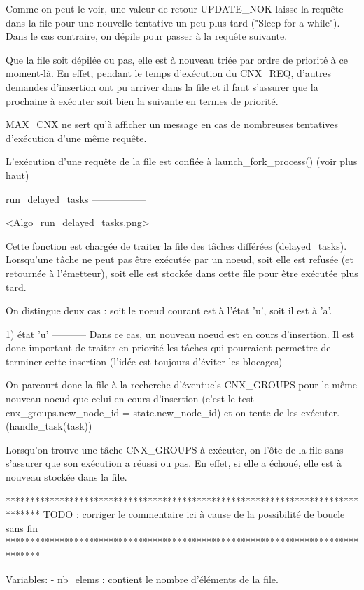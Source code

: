 Comme on peut le voir, une valeur de retour UPDATE_NOK laisse la requête dans la file pour une
nouvelle tentative un peu plus tard ("Sleep for a while"). Dans le cas contraire, on dépile pour
passer à la requête suivante.

Que la file soit dépilée ou pas, elle est à nouveau triée par ordre de priorité à ce moment-là. En
effet, pendant le temps d'exécution du CNX_REQ, d'autres demandes d'insertion ont pu arriver dans la
file et il faut s'assurer que la prochaine à exécuter soit bien la suivante en termes de priorité.

MAX_CNX ne sert qu'à afficher un message en cas de nombreuses tentatives d'exécution d'une même
requête.

L'exécution d'une requête de la file est confiée à launch_fork_process() (voir plus haut)


run_delayed_tasks
-----------------

<Algo_run_delayed_tasks.png>

Cette fonction est chargée de traiter la file des tâches différées (delayed_tasks). Lorsqu'une tâche
ne peut pas être exécutée par un noeud, soit elle est refusée (et retournée à l'émetteur), soit
elle est stockée dans cette file pour être exécutée plus tard.

On distingue deux cas : soit le noeud courant est à l'état 'u', soit il est à 'a'.

1) état 'u'
-----------
Dans ce cas, un nouveau noeud est en cours d'insertion. Il est donc important de traiter en priorité
les tâches qui pourraient permettre de terminer cette insertion (l'idée est toujours d'éviter les
blocages)

On parcourt donc la file à la recherche d'éventuels CNX_GROUPS pour le même nouveau noeud que celui
en cours d'insertion (c'est le test cnx_groups.new_node_id = state.new_node_id) et on tente de les
exécuter. (handle_task(task))

Lorsqu'on trouve une tâche CNX_GROUPS à exécuter, on l'ôte de la file sans s'assurer que son
exécution a réussi ou pas. En effet, si elle a échoué, elle est à nouveau stockée dans la file.

*******************************************************************************
TODO : corriger le commentaire ici à cause de la possibilité de boucle sans fin
*******************************************************************************

Variables: 
    - nb_elems : contient le nombre d'éléments de la file.

